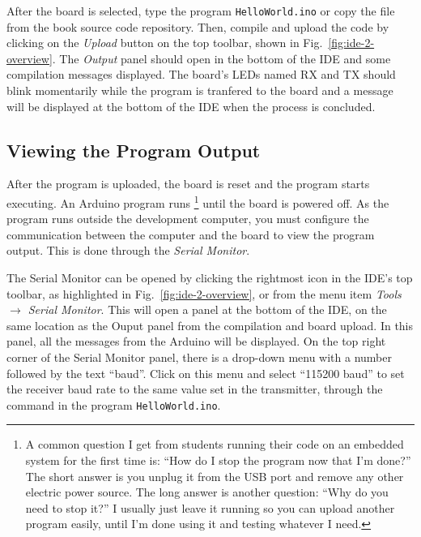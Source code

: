 After the board is selected, type the program \texttt{HelloWorld.ino} or copy the file from the book source code repository.
Then, compile and upload the code by clicking on the \emph{Upload} button on the top toolbar, shown in Fig.~\ref{fig:ide-2-overview}.
The \emph{Output} panel should open in the bottom of the IDE and some compilation messages displayed.
The board's LEDs named RX and TX should blink momentarily while the program is tranfered to the board and a message will be displayed at the bottom of the IDE when the process is concluded.

\subsection{Viewing the Program Output}
After the program is uploaded, the board is reset and the program starts executing.
An Arduino program runs%
\footnote{%
  A common question I get from students running their code on an embedded system for the first time is: ``How do I stop the program now that I'm done?''
  The short answer is you unplug it from the USB port and remove any other electric power source.
  The long answer is another question: ``Why do you need to stop it?'' I usually just leave it running so you can upload another program easily, until I'm done using it and testing whatever I need.%
}
until the board is powered off.
As the program runs outside the development computer, you must configure the communication between the computer and the board to view the program output.
This is done through the \emph{Serial Monitor}.

The Serial Monitor can be opened by clicking the rightmost icon in the IDE's top toolbar, as highlighted in Fig.~\ref{fig:ide-2-overview}, or from the menu item \emph{Tools $\to$ Serial Monitor}.
This will open a panel at the bottom of the IDE, on the same location as the Ouput panel from the compilation and board upload.
In this panel, all the messages from the Arduino will be displayed.
On the top right corner of the Serial Monitor panel, there is a drop-down menu with a number followed by the text ``baud''.
Click on this menu and select ``115200 baud'' to set the receiver baud rate to the same value set in the transmitter, through the command  in the program \texttt{HelloWorld.ino}.

